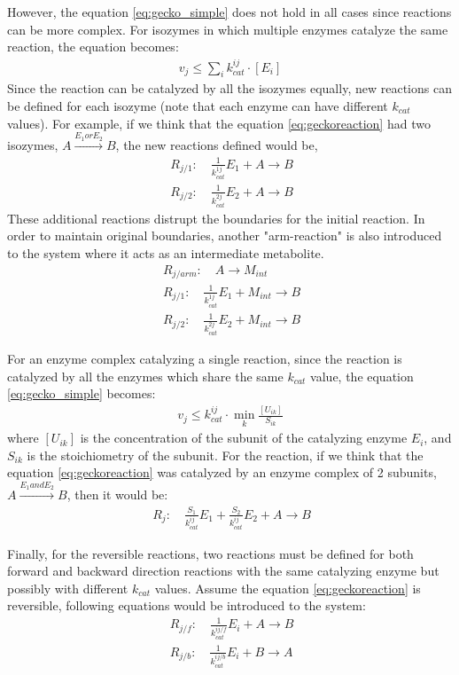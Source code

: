 However, the equation \ref{eq:gecko_simple} does not hold in all cases since reactions can be more complex. For isozymes in which multiple enzymes catalyze the same reaction, the equation becomes:
\begin{align}
 \label{eq:gecko_isozymes}
 \ v_{j} \leq \sum\limits_{i} k_{cat}^{ij} \cdot [E_{i}]
 \
\end{align}
Since the reaction can be catalyzed by all the isozymes equally, new reactions can be defined for each isozyme (note that each enzyme can have different $k_{cat}$ values). For example, if we think that the equation \ref{eq:geckoreaction} had two isozymes, $A \xrightarrow{E_1 or E_2} B$, the new reactions defined would be,
\begin{align}
 \ R_{j/1}: \quad \frac{1}{k_{cat}^{1j}}E_1 + A \to B \\
 \ R_{j/2}: \quad \frac{1}{k_{cat}^{2j}}E_2 + A \to B
\end{align}
These additional reactions distrupt the boundaries for the initial reaction. In order to maintain original boundaries, another "arm-reaction" is also introduced to the system where it acts as an intermediate metabolite.
\begin{align}
 \ R_{j/arm}: \quad A \to M_{int} \\
 \ R_{j/1}: \quad \frac{1}{k_{cat}^{1j}}E_1 + M_{int} \to B \\
 \ R_{j/2}: \quad \frac{1}{k_{cat}^{2j}}E_2 + M_{int} \to B
\end{align}

For an enzyme complex catalyzing a single reaction, since the reaction is catalyzed by all the enzymes which share the same $k_{cat}$ value, the equation \ref{eq:gecko_simple} becomes:
\begin{align}
 \label{eq:gecko_complex}
 \ v_{j} \leq  k_{cat}^{ij} \cdot \min\limits_{k} \frac{ [U_{ik}] }{ S_{ik} }
 \
\end{align}
\noindent where $[U_{ik}]$  is the concentration of the subunit of the catalyzing enzyme $E_{i}$, and $S_{ik}$ is the stoichiometry of the subunit. For the reaction, if we think that the equation \ref{eq:geckoreaction} was catalyzed by an enzyme complex of 2 subunits, $A \xrightarrow{E_1 and E_2} B$, then it would be:
\begin{align}
 \label{eq:gecko_complex2}
 \ R_{j}: \quad \frac{S_1}{k_{cat}^{ij}}E_1 +\frac{S_2}{k_{cat}^{ij}}E_2 + A \to B
\end{align}

Finally, for the reversible reactions, two reactions must be defined for both forward and backward direction reactions with the same catalyzing enzyme but possibly with different $k_{cat}$ values. Assume the equation \ref{eq:geckoreaction} is reversible, following equations would be introduced to the system:
\begin{align}
 \label{eq:gecko_reversible}
 \ R_{j/f}: \quad \frac{1}{k_{cat}^{ij/f}}E_i + A \to B \\
 \ R_{j/b}: \quad \frac{1}{k_{cat}^{ij/b}}E_i + B \to A
\end{align}

